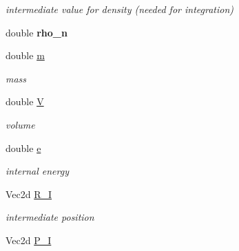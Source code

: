 \begin{CompactItemize}
\begin{CompactList}\small\item\em intermediate value for density (needed for integration) \item\end{CompactList}\item 
\hypertarget{classParticle_4a7dfc727da093aeb484b9e3a699f3b0}{
double \textbf{rho\_\-n}}
\label{classParticle_4a7dfc727da093aeb484b9e3a699f3b0}

\item 
\hypertarget{classParticle_edcc7e1bc53b0e2b1a4a07c9a1b47563}{
double \hyperlink{classParticle_edcc7e1bc53b0e2b1a4a07c9a1b47563}{m}}
\label{classParticle_edcc7e1bc53b0e2b1a4a07c9a1b47563}

\begin{CompactList}\small\item\em mass \item\end{CompactList}\item 
\hypertarget{classParticle_941e43f9d9b080269a58bc98847ea7ab}{
double \hyperlink{classParticle_941e43f9d9b080269a58bc98847ea7ab}{V}}
\label{classParticle_941e43f9d9b080269a58bc98847ea7ab}

\begin{CompactList}\small\item\em volume \item\end{CompactList}\item 
\hypertarget{classParticle_00a04c82ccc76272a9b4ae779c7583e1}{
double \hyperlink{classParticle_00a04c82ccc76272a9b4ae779c7583e1}{e}}
\label{classParticle_00a04c82ccc76272a9b4ae779c7583e1}

\begin{CompactList}\small\item\em internal energy \item\end{CompactList}\item 
\hypertarget{classParticle_ad1dfedaf6bb2f6ccd639d0a38322cca}{
Vec2d \hyperlink{classParticle_ad1dfedaf6bb2f6ccd639d0a38322cca}{R\_\-I}}
\label{classParticle_ad1dfedaf6bb2f6ccd639d0a38322cca}

\begin{CompactList}\small\item\em intermediate position \item\end{CompactList}\item 
\hypertarget{classParticle_4b83fe9f80ff112a9ef19ca0fe22d07d}{
Vec2d \hyperlink{classParticle_4b83fe9f80ff112a9ef19ca0fe22d07d}{P\_\-I}}
\label{classParticle_4b83fe9f80ff112a9ef19ca0fe22d07d}


\end{CompactItemize}
